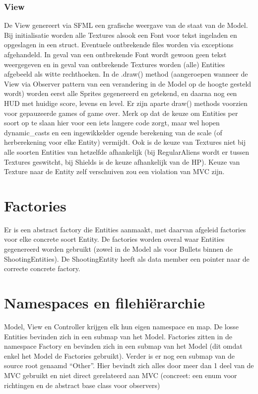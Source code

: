 \documentclass[11pt, a4paper]{article}
\begin{document}
\subsubsection{View}
De View genereert via SFML een grafische weergave van de staat van de Model. Bij initialisatie worden alle Textures alsook een Font voor tekst ingeladen en opgeslagen in een struct. Eventuele ontbrekende files worden via exceptions afgehandeld. In geval van een ontbrekende Font wordt gewoon geen tekst weergegeven en in geval van ontbrekende Textures worden (alle) Entities afgebeeld als witte rechthoeken. In de .draw() method (aangeroepen wanneer de View via Observer pattern van een verandering in de Model op de hoogte gesteld wordt) worden eerst alle Sprites gegenereerd en getekend, en daarna nog een HUD met huidige score, levens en level. Er zijn aparte draw() methods voorzien voor gepauzeerde games of game over. Merk op dat de keuze om Entities per soort op te slaan hier voor een iets langere code zorgt, maar wel hopen dynamic\_casts en een ingewikkelder ogende berekening van de scale (of herberekening voor elke Entity) vermijdt. Ook is de keuze van Textures niet bij alle soorten Entities van hetzelfde afhankelijk (bij RegularAliens wordt er tussen Textures geswitcht, bij Shields is de keuze afhankelijk van de HP). Keuze van Texture naar de Entity zelf verschuiven zou een violation van MVC zijn.

\section{Factories}
Er is een abstract factory die Entities aanmaakt, met daarvan afgeleid factories voor elke concrete soort Entity. De factories worden overal waar Entities gegenereerd worden gebruikt (zowel in de Model als voor Bullets binnen de ShootingEntities). De ShootingEntity heeft als data member een pointer naar de correcte concrete factory.

\section{Namespaces en filehiërarchie}
 Model, View en Controller krijgen elk hun eigen namespace en map. De losse Entities bevinden zich in een submap van het Model. Factories zitten in de namespace Factory en bevinden zich in een submap van het Model (dit omdat enkel het Model de Factories gebruikt). Verder is er nog een submap van de source root genaamd “Other”. Hier bevindt zich alles door meer dan 1 deel van de MVC gebruikt en niet direct gerelateerd aan MVC (concreet: een enum voor richtingen en de abstract base class voor observers)
\end{document}

